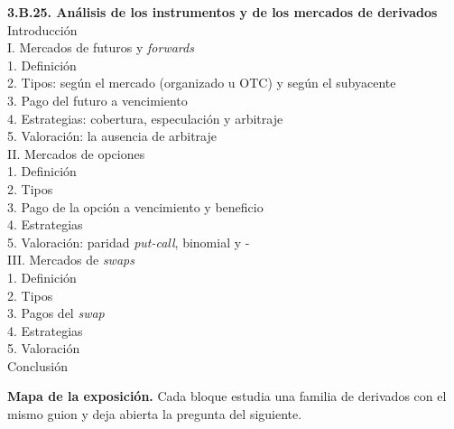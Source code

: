 \documentclass[11pt]{article}
\begin{document}
\begin{esquema}
\textbf{3.B.25. Análisis de los instrumentos y de los mercados de derivados}\\[2pt]
Introducción\\
I. Mercados de futuros y \emph{forwards}\\
\hspace*{1.5em}1. Definición\\
\hspace*{1.5em}2. Tipos: según el mercado (organizado u OTC) y según el subyacente\\
\hspace*{1.5em}3. Pago del futuro a vencimiento\\
\hspace*{1.5em}4. Estrategias: cobertura, especulación y arbitraje\\
\hspace*{1.5em}5. Valoración: la ausencia de arbitraje\\
II. Mercados de opciones\\
\hspace*{1.5em}1. Definición\\
\hspace*{1.5em}2. Tipos\\
\hspace*{1.5em}3. Pago de la opción a vencimiento y beneficio\\
\hspace*{1.5em}4. Estrategias\\
\hspace*{1.5em}5. Valoración: paridad \emph{put-call}, binomial y -\\
III. Mercados de \emph{swaps}\\
\hspace*{1.5em}1. Definición\\
\hspace*{1.5em}2. Tipos\\
\hspace*{1.5em}3. Pagos del \emph{swap}\\
\hspace*{1.5em}4. Estrategias\\
\hspace*{1.5em}5. Valoración\\
Conclusión
\end{esquema}

\begin{anotaciones}
\textbf{Mapa de la exposición.} Cada bloque estudia una familia de derivados con el mismo guion y deja abierta la pregunta del siguiente.
\begin{infografiacaja}
\caption{Mapa del tema: la pregunta de cada bloque y el hilo que los une}\label{figu:mapa-tema}
\end{infografiacaja}
\end{anotaciones}
\end{document}
